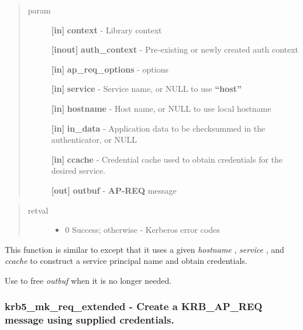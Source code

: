 \documentclass[letterpaper,10pt,english]{sphinxmanual}
\begin{document}
\begin{quote}\begin{description}
\item[{param}] \leavevmode
\textbf{{[}in{]}} \textbf{context} - Library context

\textbf{{[}inout{]}} \textbf{auth\_context} - Pre-existing or newly created auth context

\textbf{{[}in{]}} \textbf{ap\_req\_options} -  options

\textbf{{[}in{]}} \textbf{service} - Service name, or NULL to use \textbf{``host''}

\textbf{{[}in{]}} \textbf{hostname} - Host name, or NULL to use local hostname

\textbf{{[}in{]}} \textbf{in\_data} - Application data to be checksummed in the authenticator, or NULL

\textbf{{[}in{]}} \textbf{ccache} - Credential cache used to obtain credentials for the desired service.

\textbf{{[}out{]}} \textbf{outbuf} - \textbf{AP-REQ} message

\end{description}\end{quote}
\begin{quote}\begin{description}
\item[{retval}] \leavevmode\begin{itemize}
\item {} 
0   Success; otherwise - Kerberos error codes

\end{itemize}

\end{description}\end{quote}

This function is similar to {\hyperref[appdev/refs/api/krb5_mk_req_extended:c.krb5_mk_req_extended]{}} except that it uses a given \emph{hostname} , \emph{service} , and \emph{ccache} to construct a service principal name and obtain credentials.

Use {\hyperref[appdev/refs/api/krb5_free_data_contents:c.krb5_free_data_contents]{}} to free \emph{outbuf} when it is no longer needed.


\subsubsection{krb5\_mk\_req\_extended -  Create a KRB\_AP\_REQ message using supplied credentials.}
\label{appdev/refs/api/krb5_mk_req_extended::doc}\label{appdev/refs/api/krb5_mk_req_extended:krb5-mk-req-extended-create-a-krb-ap-req-message-using-supplied-credentials}
\end{document}
